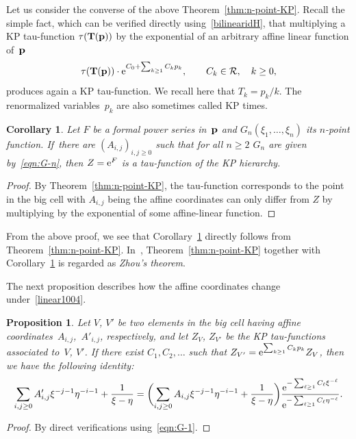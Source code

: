 \documentclass[pdftex]{sigma}
\newcommand{\beq}{\begin{equation}}
\newcommand{\eeq}{\end{equation}}
\numberwithin{equation}{section}
\newtheorem{Corollary}[Theorem]{Corollary}
\newtheorem{Proposition}[Theorem]{Proposition}
 { \theoremstyle{definition}
\newtheorem{Definition}[Theorem]{Definition}
\newtheorem{Note}[Theorem]{Note}
\newtheorem{Example}[Theorem]{Example}
\newtheorem{Remark}[Theorem]{Remark} }
\begin{document}
Let us consider the converse of the above Theorem~\ref{thm:n-point-KP}. Recall the simple fact, which can be verified directly using~\eqref{bilinearidH}, that
multiplying a KP tau-function $\tau({\bf T}({\bf p}))$
by the exponential of an arbitrary affine linear function of~${\bf p}$
\beq\label{linear1004}
\tau({\bf T}({\bf p})) \cdot {\rm e}^{C_0+\sum_{k\ge1} C_k p_k}, \qquad C_k\in\mathcal{R},\quad k\ge0,
\eeq
produces again a KP tau-function. We recall here that $T_k=p_k/k$. The renormalized variables~$p_k$ are also sometimes called KP times.

\begin{Corollary}\label{conversthmA}
Let $F$ be a formal power series in~${\bf p}$ and $G_n(\xi_1,\dots,\xi_n)$ its $n$-point function.
If~there are $(A_{i,j})_{i,j\geq 0}$ such that for all $n\ge2$
$G_n$ are given by~\eqref{eqn:G-n},
then $Z= {\rm e}^F$ is a tau-function of the KP hierarchy.
\end{Corollary}
\begin{proof}
By Theorem~\ref{thm:n-point-KP},
the tau-function corresponds to the point in the big cell with $A_{i,j}$ being the affine coordinates
can only differ from $Z$ by multiplying by the exponential of some affine-linear function.
\end{proof}

\begin{Remark}
From the above proof, we see that Corollary~\ref{conversthmA} directly follows from Theorem~\ref{thm:n-point-KP}. In~\cite{ABDBKS},
Theorem~\ref{thm:n-point-KP} together with Corollary~\ref{conversthmA} is regarded as {\it Zhou's theorem}.
\end{Remark}

The next proposition describes how the affine coordinates change under~\eqref{linear1004}.

\begin{Proposition}\label{VVprimelinear}
Let $V$, $V'$ be two elements in the big cell having affine coordinates~$A_{i,j}$,~$A'_{i,j}$, respectively,
and let $Z_V$, $Z_{V'}$ be the KP tau-functions associated to~$V$, $V'$. If there exist $C_1,C_2,\dots$ such that
$
Z_{V'} = {\rm e}^{\sum_{k\ge1} C_k p_k} Z_V$,
then we have the following identity:
\begin{gather*}%
\sum_{i,j \geq 0} A'_{i,j} \xi^{-j-1} \eta^{-i-1} + \frac1{\xi-\eta} = \biggl(\sum_{i,j \geq 0} A_{i,j} \xi^{-j-1} \eta^{-i-1} + \frac1{\xi-\eta}\biggr)
\frac{{\rm e}^{-\sum_{\ell\ge1} C_\ell \xi^{-\ell}}}{{\rm e}^{-\sum_{\ell\ge1} C_\ell \eta^{-\ell}}}.
\end{gather*}
\end{Proposition}
\begin{proof}
By direct verifications using~\eqref{eqn:G-1}.
\end{proof}
\end{document}
